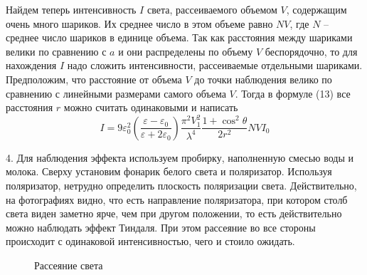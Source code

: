 \documentclass[14pt]{article}
\begin{document}
Найдем теперь интенсивность $I$ света, рассеиваемого объемом $V$, содержащим очень много шариков. Их среднее число в этом объеме равно $NV$, где $N$ -- среднее число шариков
в единице объема. Так как расстояния между шариками велики по сравнению с $a$ и они распределены по объему $V$ беспорядочно, то для нахождения $I$ надо сложить интенсивности, рассеиваемые отдельными шариками. Предположим, что расстояние от объема $V$ до точки наблюдения велико по сравнению с линейными размерами самого объема $V$. Тогда в формуле (13) все расстояния $r$ можно считать одинаковыми и написать
\begin{equation}
	I = 9\varepsilon_0^2\left(\frac{\varepsilon - \varepsilon_0}{\varepsilon + 2\varepsilon_0}\right)\frac{\pi^2V_1^2}{\lambda^4}\frac{1+\cos^2\theta}{2r^2}NVI_0
\end{equation}

4. Для наблюдения эффекта используем пробирку, наполненную смесью воды и молока. Сверху установим фонарик белого света и поляризатор. Используя поляризатор, нетрудно определить плоскость поляризации света. Действительно, на фотографиях видно, что есть направление поляризатора, при котором столб света виден заметно ярче, чем при другом положении, то есть действительно можно наблюдать эффект Тиндаля. При этом рассеяние во все стороны происходит с одинаковой интенсивностью, чего и стоило ожидать.

\begin{figure}[h!]
	\caption{Рассеяние света}
\end{figure}
\end{document}
